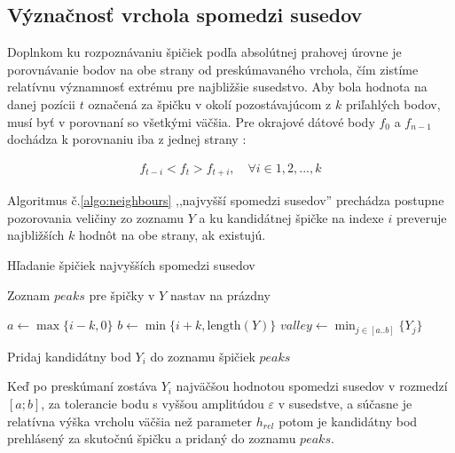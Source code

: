 \subsection{Význačnosť vrchola spomedzi susedov}
Doplnkom ku rozpoznávaniu špičiek podľa absolútnej prahovej úrovne je porovnávanie bodov na
obe strany od preskúmavaného vrchola, čím zistíme relatívnu významnosť extrému pre najbližšie susedstvo.
Aby bola hodnota na danej pozícii $t$ označená za špičku v okolí pozostávajúcom z $k$ priľahlých bodov,
musí byť v porovnaní so všetkými väčšia. Pre okrajové dátové body $f_0$ a $f_{n-1}$ dochádza k porovnaniu
iba z jednej strany \cite{survey-peaks-valleys}:
\begin{ceqn}\begin{align}
f_{t-i} < f_t > f_{t+i},\quad \forall i \in 1, 2, ..., k
\end{align}\end{ceqn}

Algoritmus č.\ref{algo:neighbours} ,,najvyšší spomedzi susedov'' \cite{peak-finding}
prechádza postupne pozorovania veličiny zo zoznamu $Y$ a ku kandidátnej špičke na indexe $i$ preveruje najbližších
$k$ hodnôt na obe strany, ak existujú.
\begin{algorithm}[h]
\caption{Hľadanie špičiek najvyšších spomedzi susedov}
\begin{algorithmic}[1]

\State Zoznam $peaks$ pre špičky v $Y$ nastav na prázdny

	\State $a \gets \max\{i - k, 0\}$
	\State $b \gets \min\{i + k, \mathrm{length}(Y)\}$	
	\State $valley \gets \min_{j \in [a..b]}\{Y_j\}$
			
	 
	
			\State Pridaj kandidátny bod $Y_i$ do zoznamu špičiek $peaks$
		\EndIf
	\EndIf
\EndFor
\end{algorithmic}
\label{algo:neighbours}
\end{algorithm}

Keď po preskúmaní zostáva $Y_i$ najväčšou hodnotou spomedzi susedov
v rozmedzí $[a; b]$, za tolerancie bodu s vyššou amplitúdou $\varepsilon$ v susedstve, a súčasne je relatívna
výška vrcholu väčšia než parameter $h_{rel}$ potom je kandidátny bod prehlásený
za skutočnú špičku a pridaný do zoznamu $peaks$.

